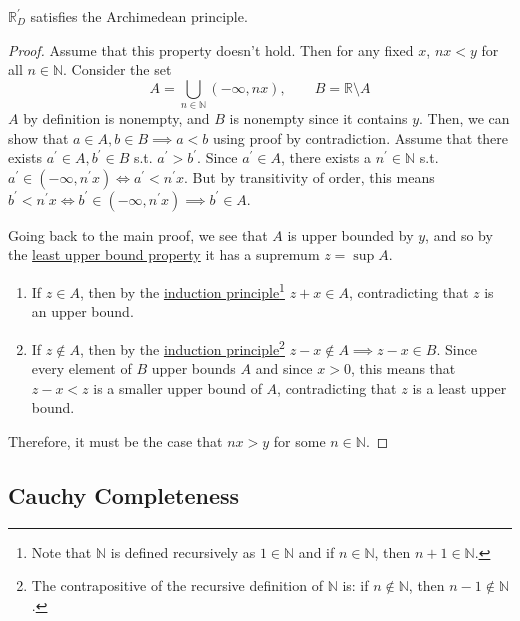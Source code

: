   \begin{theorem}
    \label{thm:axiomatic-dedekind-reals-is-archimedean}
    $\mathbb{R}_D^\prime$ satisfies the Archimedean principle. 
  \end{theorem}
  \begin{proof}
    Assume that this property doesn't hold. Then for any fixed $x$, $nx < y$ for all $n \in \mathbb{N}$. Consider the set 
    \begin{equation}
      A = \bigcup_{n \in \mathbb{N}} (-\infty, nx), \qquad B = \mathbb{R} \setminus A
    \end{equation}
    $A$ by definition is nonempty, and $B$ is nonempty since it contains $y$. Then, we can show that $a \in A, b \in B \implies a < b$ using proof by contradiction. Assume that there exists $a^\prime \in A, b^\prime \in B$ s.t. $a^\prime > b^\prime$. Since $a^\prime \in A$, there exists a $n^\prime \in \mathbb{N}$ s.t. $a^\prime \in (-\infty, n^\prime x) \iff a^\prime < n^\prime x$. But by transitivity of order, this means $b^\prime < n^\prime x \iff b^\prime \in (-\infty, n^\prime x) \implies b^\prime \in A$. 

    Going back to the main proof, we see that $A$ is upper bounded by $y$, and so by the \hyperref[alg-def:least-upper-bound-property]{least upper bound property} it has a supremum $z = \sup{A}$. 
    \begin{enumerate}
      \item If $z \in A$, then by the \hyperref[st-thm:induction-principle]{induction principle}\footnote{Note that $\mathbb{N}$ is defined recursively as $1 \in \mathbb{N}$ and if $n \in \mathbb{N}$, then $n+1 \in \mathbb{N}$. } $z + x \in A$, contradicting that $z$ is an upper bound. 
      \item If $z \not\in A$, then by the \hyperref[st-thm:induction-principle]{induction principle}\footnote{The contrapositive of the recursive definition of $\mathbb{N}$ is: if $n \not\in \mathbb{N}$, then $n-1 \not\in \mathbb{N}$.} $z-x \not\in A \implies z-x \in B$. Since every element of $B$ upper bounds $A$ and since $x > 0$, this means that $z-x < z$ is a smaller upper bound of $A$, contradicting that $z$ is a least upper bound. 
    \end{enumerate}
    Therefore, it must be the case that $nx > y$ for some $n \in \mathbb{N}$. 
  \end{proof}

\subsection{Cauchy Completeness} 

